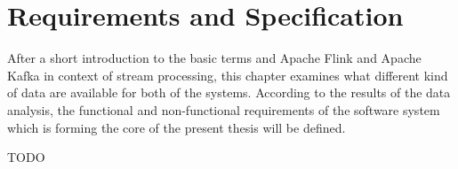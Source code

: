 \chapter{Requirements and Specification}

After a short introduction to the basic terms and Apache Flink and Apache Kafka in
context of stream processing, this chapter examines what different kind of data are available
for both of the systems. According to the results of the data analysis, the functional and
non-functional requirements of the software system which is forming the core of the present
thesis will be defined.

TODO

%
%
%
%
%
